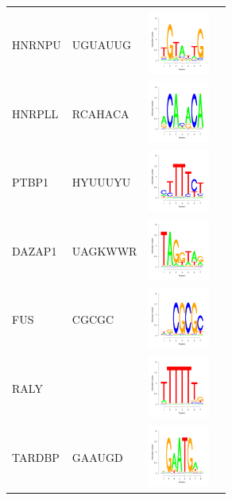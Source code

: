 \documentclass[a4paper,10pt]{article}
\begin{document}
\begin{center}
\begin{longtable}{|l|l|l|p{6cm}|}
 & \\
 \cline{1-3}
HNRNPU & UGUAUUG & \includegraphics[height=0.8in]{./seqLogo/HNRNPU_uguauug.pdf}
 &  \\
 \cline{1-3}
HNRPLL & RCAHACA & \includegraphics[height=0.8in]{./seqLogo/HNRPLL_rcahaca.pdf}
 & \\
 \cline{1-3}
PTBP1 &  HYUUUYU & \includegraphics[height=0.8in]{./seqLogo/PTBP1_hyuuuyu.pdf}
 &  \\
  \cline{1-3}
 DAZAP1 & UAGKWWR &  \includegraphics[height=0.8in]{./seqLogo/DAZAP1_uagkwwr.pdf} & \\
  \cline{1-3}
FUS & CGCGC & \includegraphics[height=0.8in]{./seqLogo/FUS_cgcgc.pdf} & \\
\cline{1-3}
RALY & & \includegraphics[height=0.8in]{./seqLogo/RALY_uuuuuub.pdf} & \\
\cline{1-3}
TARDBP & GAAUGD  & \includegraphics[height=0.8in]{./seqLogo/TARDBP_gaaugd.pdf} & \\

\end{longtable}
\end{center}
\end{document}
